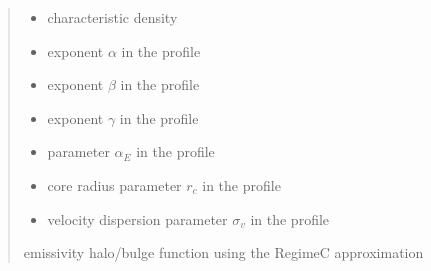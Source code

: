 \documentclass[letterpaper,10pt,english]{sphinxmanual}
\begin{document}
\begin{fulllineitems}
\begin{quote}
\begin{description}
\begin{itemize}
\item {} 
\sphinxAtStartPar
{} \textendash{} characteristic density

\item {} 
\sphinxAtStartPar
{} \textendash{} exponent \(\alpha\) in the {\hyperref[\detokenize{diffsph.profiles:diffsph.profiles.templates.hdz}]{}} profile

\item {} 
\sphinxAtStartPar
{} \textendash{} exponent \(\beta\) in the {\hyperref[\detokenize{diffsph.profiles:diffsph.profiles.templates.hdz}]{}} profile

\item {} 
\sphinxAtStartPar
{} \textendash{} exponent \(\gamma\) in the {\hyperref[\detokenize{diffsph.profiles:diffsph.profiles.templates.hdz}]{}} profile

\item {} 
\sphinxAtStartPar
{} \textendash{} parameter \(\alpha_E\) in the {\hyperref[\detokenize{diffsph.profiles:diffsph.profiles.templates.enst}]{}} profile

\item {} 
\sphinxAtStartPar
{} \textendash{} core radius parameter \(r_c\) in the {\hyperref[\detokenize{diffsph.profiles:diffsph.profiles.templates.cnfw}]{}} profile

\item {} 
\sphinxAtStartPar
{} \textendash{} velocity dispersion parameter \(\sigma_v\) in the {\hyperref[\detokenize{diffsph.profiles:diffsph.profiles.templates.sis}]{}} profile

\end{itemize}

\sphinxAtStartPar
emissivity halo/bulge function using the Regime\sphinxhyphen{}C approximation

\end{description}\end{quote}

\end{fulllineitems}
\end{document}
